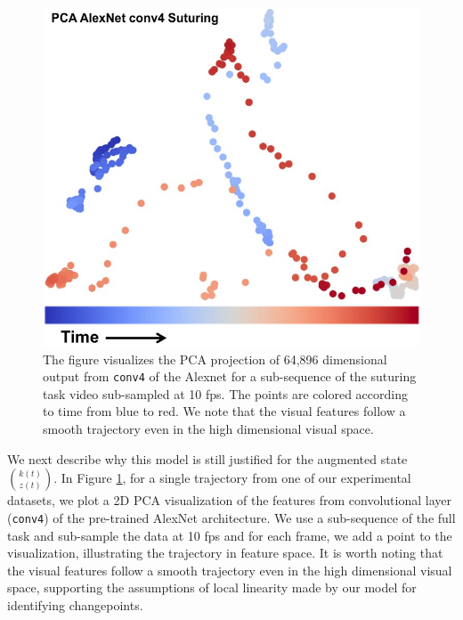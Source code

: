 \begin{figure}[t!]
\centering
\includegraphics[width=0.7\linewidth]{figures/pca_conv4.png}
\caption{The figure visualizes the PCA projection of 64,896 dimensional output from \texttt{conv4} of the Alexnet for a sub-sequence of the suturing task video sub-sampled at 10 fps. The points are colored according to time from blue to red. We note that the visual features follow a smooth trajectory even in the high dimensional visual space.   \label{fig:imgtraj}}
\vspace{-10pt}
\end{figure}

We next describe why this model is still justified for the augmented state $\binom{k(t)}{z(t)}$.
In Figure \ref{fig:imgtraj}, for a single trajectory from one of our experimental datasets, we plot a 2D PCA visualization of the features from convolutional layer (\texttt{conv4}) of the pre-trained AlexNet architecture. We use a sub-sequence of the full task and sub-sample the data at 10 fps and for each frame, we add a point to the visualization, illustrating the trajectory in feature space. It is worth noting that the visual features follow a smooth trajectory even in the high dimensional visual space, supporting the assumptions of local linearity made by our model for identifying changepoints.